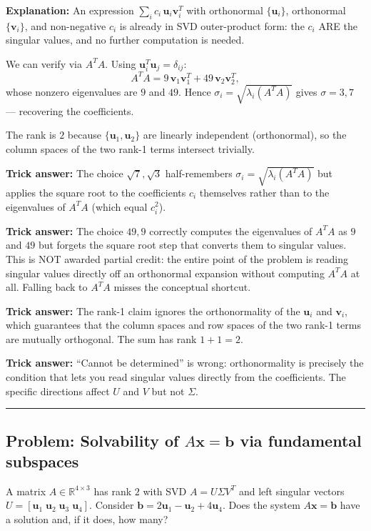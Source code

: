 \documentclass[12pt]{amsart}
\newcommand{\divider}{
  \vspace{-1em}
  \noindent
  \raisebox{-0.15ex}{\textbullet}%
  \hspace{0.5em}%
  \rule[0.5ex]{0.95\textwidth}{1.0pt}%
  \hspace{0.5em}%
  \raisebox{-0.15ex}{\textbullet}%
  \vspace{0em}
}
\begin{document}
\textbf{Explanation:}
An expression $\sum_i c_i\,\mathbf{u}_i\mathbf{v}_i^T$ with orthonormal
$\{\mathbf{u}_i\}$, orthonormal $\{\mathbf{v}_i\}$, and non-negative $c_i$
is already in SVD outer-product form: the $c_i$ ARE the singular values,
and no further computation is needed.

We can verify via $A^TA$. Using $\mathbf{u}_i^T\mathbf{u}_j = \delta_{ij}$:
$$A^TA = 9\,\mathbf{v}_1\mathbf{v}_1^T + 49\,\mathbf{v}_2\mathbf{v}_2^T,$$
whose nonzero eigenvalues are $9$ and $49$. Hence
$\sigma_i = \sqrt{\lambda_i(A^TA)}$ gives $\sigma = 3, 7$ ---
recovering the coefficients.

The rank is $2$ because $\{\mathbf{u}_1, \mathbf{u}_2\}$ are linearly independent
(orthonormal), so the column spaces of the two rank-1 terms intersect trivially.

\textbf{Trick answer:}
The choice $\sqrt{7}, \sqrt{3}$ half-remembers $\sigma_i = \sqrt{\lambda_i(A^TA)}$
but applies the square root to the coefficients $c_i$ themselves rather than to
the eigenvalues of $A^TA$ (which equal $c_i^2$).

\textbf{Trick answer:}
The choice $49, 9$ correctly computes the eigenvalues of $A^TA$ as $9$ and $49$
but forgets the square root step that converts them to singular values.
This is NOT awarded partial credit: the entire point of the problem is reading
singular values directly off an orthonormal expansion without computing $A^TA$
at all. Falling back to $A^TA$ misses the conceptual shortcut.

\textbf{Trick answer:}
The rank-1 claim ignores the orthonormality of the $\mathbf{u}_i$ and
$\mathbf{v}_i$, which guarantees that the column spaces and row spaces of the
two rank-1 terms are mutually orthogonal. The sum has rank $1+1 = 2$.

\textbf{Trick answer:}
``Cannot be determined'' is wrong: orthonormality is precisely the condition
that lets you read singular values directly from the coefficients.
The specific directions affect $U$ and $V$ but not $\Sigma$.

\divider

\subsection*{Problem: Solvability of $A\mathbf{x} = \mathbf{b}$ via fundamental subspaces}

A matrix $A \in \mathbb{R}^{4 \times 3}$ has rank $2$ with SVD $A = U\Sigma V^T$
and left singular vectors $U = [\mathbf{u}_1\;\mathbf{u}_2\;\mathbf{u}_3\;\mathbf{u}_4]$.
Consider $\mathbf{b} = 2\mathbf{u}_1 - \mathbf{u}_2 + 4\mathbf{u}_4$.
Does the system $A\mathbf{x} = \mathbf{b}$ have a solution and, if it does, how many?
\end{document}
